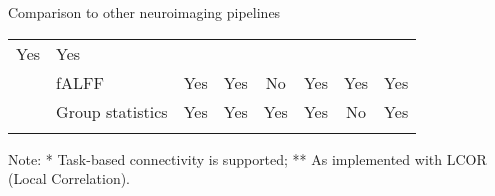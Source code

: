 \begin{tablebox}[label={table:comparison}]{Comparison to other neuroimaging pipelines}
\begin{tabularx}{\textwidth}{@{} | K{1.5cm} | K{2cm} |
C | C | C | C | C | C | @{}}
Yes &%
Yes \\
\hhline{~|-|-|-|-|-|-|-|}
& fALFF &%
Yes &%
Yes &%
No &%
Yes &%
Yes &%
Yes \\
\hhline{~|-|-|-|-|-|-|-|}
& Group statistics &%
Yes &%
Yes &%
Yes &%
Yes &%
No &%
Yes \\
\hhline{-|-|-|-|-|-|-|-|}
\end{tabularx}\par
\vspace*{2mm}
Note: * Task-based connectivity is supported; ** As implemented with LCOR (Local Correlation).
\endgroup

\end{tablebox}
